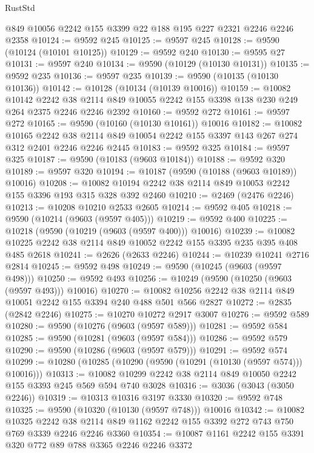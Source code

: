 \begin{lexlean}{RustStd}
\begin{coremodule}
    @849
    @10056
    @2242
    @155
    @3399
    @22
    @188
    @195
    @227
    @2321
    @2246
    @2246
    @2358
@10124 := @9592 @245
@10125 := @9597 @245
@10128 := @9590 (@10124 (@10101 @10125))
@10129 := @9592 @240
@10130 := @9595 @27
@10131 := @9597 @240
@10134 := @9590 (@10129 (@10130 @10131))
@10135 := @9592 @235
@10136 := @9597 @235
@10139 := @9590 (@10135 (@10130 @10136))
@10142 := @10128 (@10134 (@10139 @10016))
@10159 := @10082
    @10142
    @2242
    @38
    @2114
    @849
    @10055
    @2242
    @155
    @3398
    @138
    @230
    @249
    @264
    @2375
    @2246
    @2246
    @2392
@10160 := @9592 @272
@10161 := @9597 @272
@10165 := @9590 (@10160 (@10130 @10161)) @10016
@10182 := @10082
    @10165
    @2242
    @38
    @2114
    @849
    @10054
    @2242
    @155
    @3397
    @143
    @267
    @274
    @312
    @2401
    @2246
    @2246
    @2445
@10183 := @9592 @325
@10184 := @9597 @325
@10187 := @9590 (@10183 (@9603 @10184))
@10188 := @9592 @320
@10189 := @9597 @320
@10194 := @10187 (@9590 (@10188 (@9603 @10189)) @10016)
@10208 := @10082 @10194 @2242 @38 @2114 @849 @10053 @2242 @155 @3396 @193 @315 @328 @392 @2460
@10210 := @2469 (@2476 @2246)
@10213 := @10208 @10210 @2533 @2605
@10214 := @9592 @405
@10218 := @9590 (@10214 (@9603 (@9597 @405)))
@10219 := @9592 @400
@10225 := @10218 (@9590 (@10219 (@9603 (@9597 @400))) @10016)
@10239 := @10082 @10225 @2242 @38 @2114 @849 @10052 @2242 @155 @3395 @235 @395 @408 @485 @2618
@10241 := @2626 (@2633 @2246)
@10244 := @10239 @10241 @2716 @2814
@10245 := @9592 @498
@10249 := @9590 (@10245 (@9603 (@9597 @498)))
@10250 := @9592 @493
@10256 := @10249 (@9590 (@10250 (@9603 (@9597 @493))) @10016)
@10270 := @10082 @10256 @2242 @38 @2114 @849 @10051 @2242 @155 @3394 @240 @488 @501 @566 @2827
@10272 := @2835 (@2842 @2246)
@10275 := @10270 @10272 @2917 @3007
@10276 := @9592 @589
@10280 := @9590 (@10276 (@9603 (@9597 @589)))
@10281 := @9592 @584
@10285 := @9590 (@10281 (@9603 (@9597 @584)))
@10286 := @9592 @579
@10290 := @9590 (@10286 (@9603 (@9597 @579)))
@10291 := @9592 @574
@10299 := @10280 (@10285 (@10290 (@9590 (@10291 (@10130 (@9597 @574))) @10016)))
@10313 := @10082 @10299 @2242 @38 @2114 @849 @10050 @2242 @155 @3393 @245 @569 @594 @740 @3028
@10316 := @3036 (@3043 (@3050 @2246))
@10319 := @10313 @10316 @3197 @3330
@10320 := @9592 @748
@10325 := @9590 (@10320 (@10130 (@9597 @748))) @10016
@10342 := @10082
    @10325
    @2242
    @38
    @2114
    @849
    @1162
    @2242
    @155
    @3392
    @272
    @743
    @750
    @769
    @3339
    @2246
    @2246
    @3360
@10354 := @10087 @1161 @2242 @155 @3391 @320 @772 @89 @788 @3365 @2246 @2246 @3372

\end{coremodule}
\end{lexlean}
